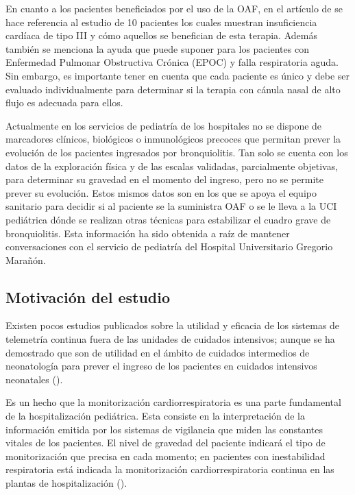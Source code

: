 En cuanto a los pacientes beneficiados por el uso de la OAF, en el artículo de \cite{Lodeserto2018} se hace referencia al estudio de 10 pacientes los cuales muestran insuficiencia cardíaca de tipo III y cómo aquellos se benefician de esta terapia. Además también se menciona la ayuda que puede suponer para los pacientes con Enfermedad Pulmonar Obstructiva Crónica (EPOC) y falla respiratoria aguda. Sin embargo, es importante tener en cuenta que cada paciente es único y debe ser evaluado individualmente para determinar si la terapia con cánula nasal de alto flujo es adecuada para ellos.

Actualmente en los servicios de pediatría de los hospitales no se dispone de marcadores clínicos, biológicos o inmunológicos precoces que permitan prever la evolución de los pacientes ingresados por bronquiolitis. Tan solo se cuenta con los datos de la exploración física y de las escalas validadas, parcialmente objetivas, para determinar su gravedad en el momento del ingreso, pero no se permite prever su evolución. Estos mismos datos son en los que se apoya el equipo sanitario para decidir si al paciente se la suministra OAF o se le lleva a la UCI pediátrica dónde se realizan otras técnicas para estabilizar el cuadro grave de bronquiolitis. Esta información ha sido obtenida a raíz de mantener conversaciones con el servicio de pediatría del Hospital Universitario Gregorio Marañón.


\subsection{Motivación del estudio}

Existen pocos estudios publicados sobre la utilidad y eficacia de los sistemas de telemetría continua fuera de las unidades de cuidados intensivos; aunque se ha demostrado que son de utilidad en el ámbito de cuidados intermedios de neonatología para prever el ingreso de los pacientes en cuidados intensivos neonatales (\cite{Solis2022}).

Es un hecho que la monitorización cardiorrespiratoria es una parte fundamental de la hospitalización pediátrica. Esta consiste en la interpretación de la información emitida por los sistemas de vigilancia que miden las constantes vitales de los pacientes. El nivel de gravedad del paciente indicará el tipo de monitorización que precisa en cada momento; en pacientes con inestabilidad respiratoria está indicada la monitorización cardiorrespiratoria continua en las plantas de hospitalización (\cite{AmandaC}).

